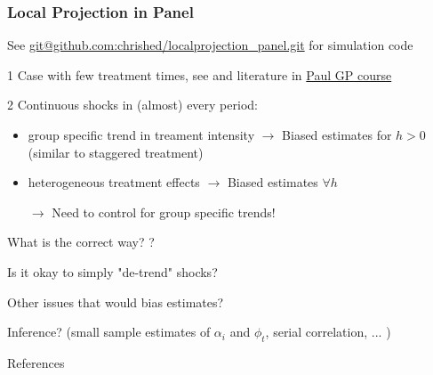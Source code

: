 \documentclass[notes,11pt, aspectratio = 169]{beamer}
\begin{document}
\begin{frame}\frametitle{Local Projection in Panel}
   See \url{git@github.com:chrished/localprojection_panel.git} for simulation code
    \begin{wideitemize}
        \item[1] Case with few treatment times, see \cite{dube2023local} and literature in \href{https://github.com/paulgp/applied-methods-phd}{Paul GP course}
        \item[2] Continuous shocks in (almost) every period: 
        \begin{itemize}
            \item group specific trend in treament intensity $\rightarrow$ Biased estimates for $h>0$ (similar to staggered treatment) 
            \item heterogeneous treatment effects  $\rightarrow$ Biased estimates $\forall h$
            \item[$\rightarrow$] Need to control for group specific trends! 
        \end{itemize}
        \item What is the correct way? \citet{de2022difference}? 
        \item Is it okay to simply "de-trend" shocks? 
        \item Other issues that would bias estimates?
        \item Inference? (small sample estimates of $\alpha_i$ and $\phi_t$, serial correlation, ... )
    \end{wideitemize}

\end{frame}

\begin{frame}[allowframebreaks]{References}

    
    
    \end{frame}
\end{document}
